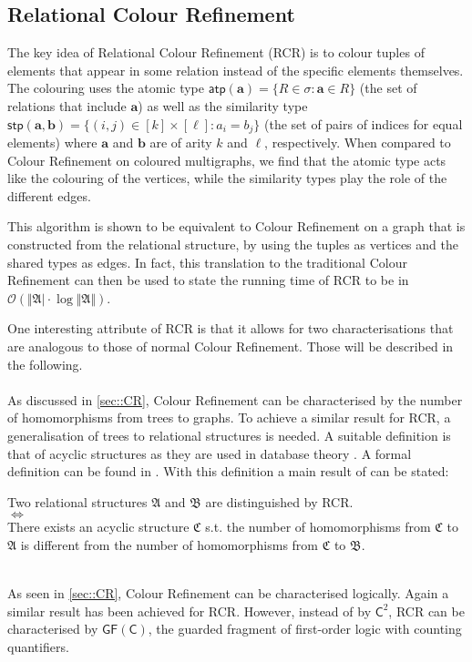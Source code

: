 \documentclass[a4paper,11pt,DIV=15]{scrartcl} %
\theoremstyle{plain}
\theoremstyle{definition}
\begin{document}
\subsection{Relational Colour Refinement}

The key idea of Relational Colour Refinement (RCR) is to colour tuples of elements that appear in some relation instead of the specific elements themselves. 
The colouring uses the atomic type $\mathsf{atp}(\mathbf{a})=\{R\in\sigma : \mathbf{a}\in R\}$ (the set of relations that include $\mathbf{a}$) as well as the similarity type $\mathsf{stp}(\mathbf{a},\mathbf{b})=\{(i,j)\in[k]\times[\ell] : a_i=b_j\}$ (the set of pairs of indices for equal elements) where $\mathbf{a}$ and $\mathbf{b}$ are of arity $k$ and $\ell$, respectively.
When compared to Colour Refinement on coloured multigraphs, we find that the atomic type acts like the colouring of the vertices, while the similarity types play the role of the different edges.

This algorithm is shown to be equivalent to Colour Refinement on a graph that is constructed from the relational structure, by using the tuples as vertices and the shared types as edges.
In fact, this translation to the traditional Colour Refinement can then be used to state the running time of RCR to be in $\mathcal O(\Vert \mathfrak A\vert\cdot \log\Vert\mathfrak A\Vert)$.

One interesting attribute of RCR is that it allows for two characterisations that are analogous to those of normal Colour Refinement. Those will be described in the following. \cite{scheidt2024color}
\\ \\
As discussed in \cref{sec::CR}, Colour Refinement can be characterised by the number of homomorphisms from trees to graphs.
To achieve a similar result for RCR, a generalisation of trees to relational structures is needed.
A suitable definition is that of acyclic structures as they are used in database theory \cite{abiteboul1995foundations}.
A formal definition can be found in \cite{scheidt2024color}.
With this definition a main result of \cite{scheidt2024color} can be stated:
\begin{center}
	Two relational structures $\mathfrak A$ and $\mathfrak B$ are distinguished by RCR.
	\\ $\Longleftrightarrow$ \\ 
	There exists an acyclic structure $\mathfrak C$ s.t. the number of homomorphisms from $\mathfrak C$ to $\mathfrak A$ is different from the number of homomorphisms from $\mathfrak C$ to $\mathfrak B$.
\end{center}
\hfill
\\
As seen in \cref*{sec::CR}, Colour Refinement can be characterised logically.
Again a similar result has been achieved for RCR.
However, instead of by $\mathsf C^2$, RCR can be characterised by $\mathsf{GF}(\mathsf C)$, the guarded fragment of first-order logic with counting quantifiers.
\end{document}
